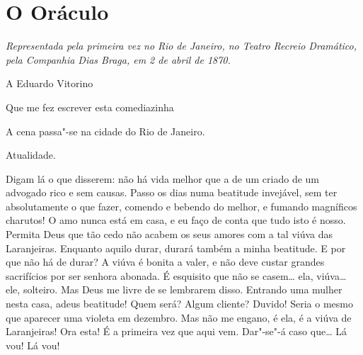 \chapter[O Oráculo]{O Oráculo}

\textit{Representada pela primeira vez no Rio de Janeiro, no Teatro
Recreio Dramático, pela Companhia Dias Braga,
em 2 de abril de 1870.}

\hfill A Eduardo Vitorino

\hfill Que me fez escrever esta comediazinha

\castpage


\vfil
A cena passa"-se na cidade do Rio de Janeiro.

Atualidade.

\pagebreak





   Digam lá o que disserem: não há vida
melhor que a de um criado de um advogado rico e sem causas. Passo os
dias numa beatitude invejável, sem ter absolutamente o que fazer,
comendo e bebendo do melhor, e fumando magníficos charutos! O amo nunca
está em casa, e eu faço de conta que tudo isto é nosso. Permita Deus
que tão cedo não acabem os seus amores com a tal viúva das Laranjeiras.
Enquanto aquilo durar, durará também a minha beatitude. E por que não
há de durar? A viúva é bonita a valer, e não deve custar grandes
sacrifícios por ser senhora abonada.  É
esquisito que não se casem\ldots{} ela, viúva\ldots{} ele, solteiro. Mas Deus me
livre de se lembrarem disso. Entrando uma mulher nesta casa, adeus
beatitude!  Quem será? Algum cliente? Duvido! Seria o mesmo
que aparecer uma violeta em dezembro.  Mas não me engano, é ela, é a viúva
de Laranjeiras! Ora esta! É a primeira vez que aqui vem. Dar"-se"-á caso
que\ldots{}  Lá vou! Lá vou!


